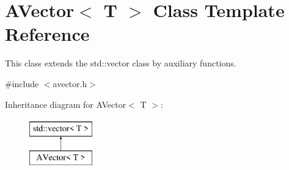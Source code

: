 \hypertarget{class_a_vector}{}\section{A\+Vector$<$ T $>$ Class Template Reference}
\label{class_a_vector}


This class extends the std\+::vector class by auxiliary functions.  




{\ttfamily \#include $<$avector.\+h$>$}

Inheritance diagram for A\+Vector$<$ T $>$\+:\begin{figure}[H]
\begin{center}
\leavevmode
\includegraphics[height=2.000000cm]{class_a_vector}
\end{center}
\end{figure}
